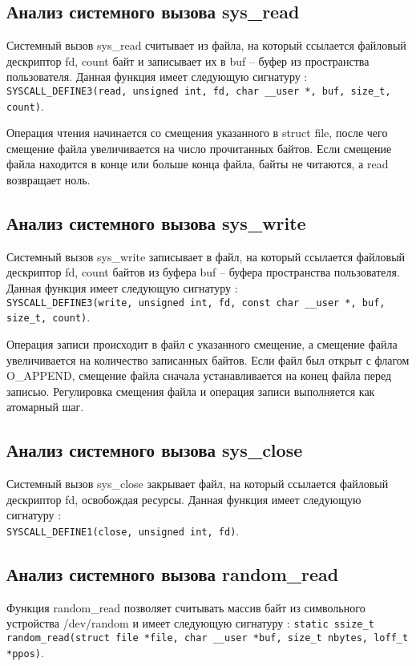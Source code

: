	 \subsection*{Анализ системного вызова sys\_read}
	 	Системный вызов sys\_read считывает из файла, 
		на который ссылается файловый дескриптор fd,
		count байт и записывает их в buf -- буфер из пространства пользователя.
		Данная функция имеет следующую сигнатуру \cite{linux-sys_read}: \\
		\lstinline{SYSCALL_DEFINE3(read, unsigned int, fd, char __user *, buf, size_t, count)}.

		Операция чтения начинается со смещения указанного в struct file, 
		после чего смещение файла увеличивается на число прочитанных байтов. 
		Если смещение файла находится в конце или больше конца файла,
		байты не читаются, а read возвращает ноль.

	 \subsection*{Анализ системного вызова sys\_write}
		Системный вызов sys\_write записывает в файл, 
		на который ссылается файловый дескриптор fd,
		count байтов из буфера buf -- буфера пространства пользователя.
		Данная функция имеет следующую сигнатуру \cite{linux-sys_write}: \\
	 	\lstinline{SYSCALL_DEFINE3(write, unsigned int, fd, const char __user *, buf, size_t, count)}.

		Операция записи происходит в файл с указанного смещение,
		а смещение файла увеличивается на количество записанных байтов.
		Если файл был открыт с флагом O\_APPEND, 
		смещение файла сначала устанавливается на конец файла перед записью.
       	Регулировка смещения файла и операция записи выполняется как атомарный шаг.

	 \subsection*{Анализ системного вызова sys\_close}
	 	Системный вызов sys\_close закрывает файл, на который ссылается файловый дескриптор fd, освобождая ресурсы.
		Данная функция имеет следующую сигнатуру \cite{linux-sys_close}: \\
	 	\lstinline{SYSCALL_DEFINE1(close, unsigned int, fd)}.

	 \subsection*{Анализ системного вызова random\_read}
	 	Функция random\_read позволяет считывать массив байт из символьного 
		устройства /dev/random и имеет следующую сигнатуру \cite{linux-random_read}: 
	 \lstinline{static ssize_t random_read(struct file *file, char __user *buf, size_t nbytes, loff_t *ppos)}.
		
